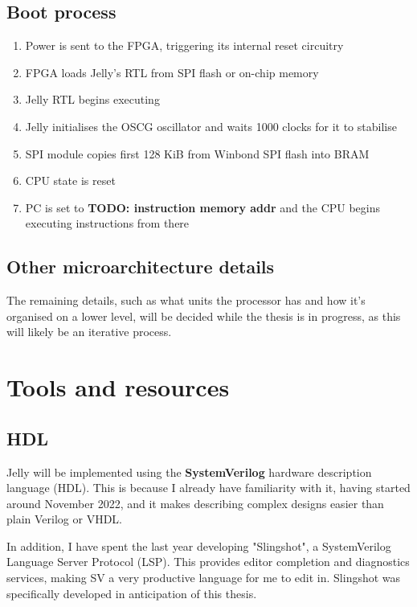 \documentclass{article}
\begin{document}
\subsection{Boot process}
\begin{enumerate}
	\item Power is sent to the FPGA, triggering its internal reset circuitry
	\item FPGA loads Jelly's RTL from SPI flash or on-chip memory
	\item Jelly RTL begins executing
	\item Jelly initialises the OSCG oscillator and waits 1000 clocks for it to stabilise
	\item SPI module copies first 128 KiB from Winbond SPI flash into BRAM
	\item CPU state is reset
	\item PC is set to \textbf{TODO: instruction memory addr} and the CPU begins executing instructions from there
\end{enumerate}

\subsection{Other microarchitecture details}
The remaining details, such as what units the processor has and how it's organised on a lower level, will be
decided while the thesis is in progress, as this will likely be an iterative process.

\section{Tools and resources}
\subsection{HDL}
Jelly will be implemented using the \textbf{SystemVerilog} hardware description language (HDL). This is
because I already have familiarity with it, having started around November 2022, and it makes describing
complex designs easier than plain Verilog or VHDL.

In addition, I have spent the last year developing "Slingshot", a SystemVerilog Language Server Protocol 
(LSP). This provides editor completion and diagnostics services, making SV a very productive language for
me to edit in. Slingshot was specifically developed in anticipation of this thesis.
\end{document}
